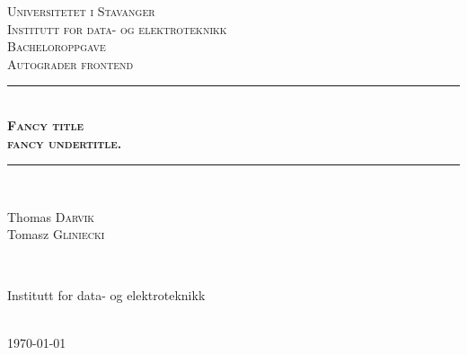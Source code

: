 \begin{titlepage}

\newcommand{\HRule}{\rule{\linewidth}{0.5mm}} %

\center %

\begin{figure}[H] %
\end{figure}

\textsc{\LARGE Universitetet i Stavanger \\\small Institutt for data- og elektroteknikk}\\[1.5cm] %
\textsc{\Large Bacheloroppgave}\\[0.5cm] %
\textsc{\large Autograder frontend}\\[0.5cm] %

\HRule \\[0.4cm]
{ \huge \bf{\textsc{Fancy  title \\\large fancy undertitle.}}}\\[0.4cm] %
\HRule \\[1.5cm]



\begin{minipage}{0.4\textwidth}
  \begin{flushleft} \large
    {\Large Thomas \textsc{Darvik}}
    \\
    {\Large Tomasz \textsc{Gliniecki}}
  \end{flushleft}
\end{minipage}
~
\begin{minipage}{0.4\textwidth}
  \begin{flushright}
    {Institutt for data- og elektroteknikk}
  \end{flushright}
\end{minipage}\\[4cm]

{\large \today}\\[3cm] %


\vfill %

\end{titlepage}
